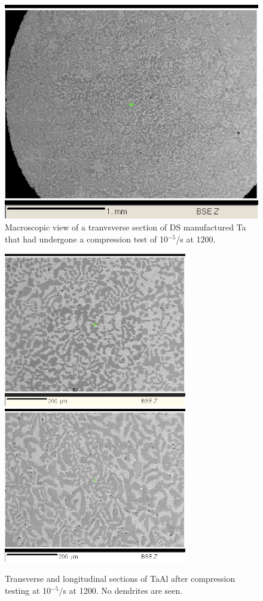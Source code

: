 %
\begin{figure}[htbp]
\begin{center}
\includegraphics[width=12cm]{manual_14_iv_trans_zoomout}
\caption{Macroscopic view of a tranvsverse section of DS manufactured Ta that had undergone a compression test of 10$^{-5}$/s at 1200\celsius.}
\label{fig:manual_14_iv_trans_zoomout}
\end{center}
\end{figure}
%
%
\begin{figure}[htbp]
\begin{center}
\includegraphics[width=8cm]{manual14_v}
\includegraphics[width=8cm]{manual14_vi}
\caption{Transverse and longitudinal sections of TaAl after compression testing at 10$^{-5}$/s at 1200\celsius.  No dendrites are seen.}\label{fig:manual14_v}
\end{center}
\end{figure}
